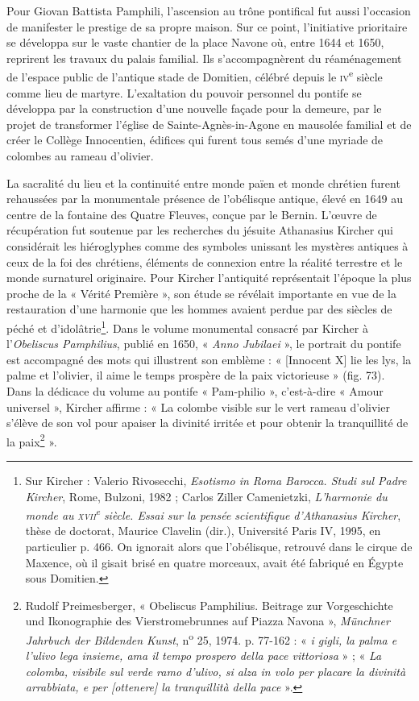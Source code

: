 \documentclass[12pt,twoside,openany]{book}
\begin{document}
Pour Giovan Battista Pamphili, l’ascension au trône pontifical fut aussi l’occasion de manifester le prestige de sa propre maison. Sur ce point, l’initiative prioritaire se développa sur le vaste chantier de la place Navone où, entre 1644 et 1650, reprirent les travaux du palais familial. Ils s’accompagnèrent du réaménagement de l’espace public de l’antique stade de Domitien, célébré depuis le \textsc{iv}\textsuperscript{e} siècle comme lieu de martyre. L’exaltation du pouvoir personnel du pontife se développa par la construction d’une nouvelle façade pour la demeure, par le projet de transformer l’église de Sainte-Agnès-in-Agone en mausolée familial et de créer le Collège Innocentien, édifices qui furent tous semés d’une myriade de colombes au rameau d’olivier.

La sacralité du lieu et la continuité entre monde païen et monde chrétien furent rehaussées par la monumentale présence de l’obélisque antique, élevé en 1649 au centre de la fontaine des Quatre Fleuves, conçue par le Bernin. L’œuvre de récupération fut soutenue par les recherches du jésuite Athanasius Kircher qui considérait les hiéroglyphes comme des symboles unissant les mystères antiques à ceux de la foi des chrétiens, éléments de connexion entre la réalité terrestre et le monde surnaturel originaire. Pour Kircher l’antiquité représentait l’époque la plus proche de la « Vérité Première », son étude se révélait importante en vue de la restauration d’une harmonie que les hommes avaient perdue par des siècles de péché et d’idolâtrie\footnote{Sur Kircher : Valerio Rivosecchi, \textit{Esotismo in Roma Barocca. Studi sul Padre Kircher}, Rome, Bulzoni, 1982 ; Carlos Ziller Camenietzki, \textit{L’harmonie du monde au }\textit{\textsc{xvii}}\textit{\textsuperscript{e}}\textit{ siècle. Essai sur la pensée scientifique d’Athanasius Kircher}, thèse de doctorat, Maurice Clavelin (dir.), Université Paris IV, 1995, en particulier p. 466. On ignorait alors que l’obélisque, retrouvé dans le cirque de Maxence, où il gisait brisé en quatre morceaux, avait été fabriqué en Égypte sous Domitien.}. Dans le volume monumental consacré par Kircher à l’\textit{Obeliscus Pamphilius}, publié en 1650, « \textit{Anno Jubilaei} », le portrait du pontife est accompagné des mots qui illustrent son emblème : « [Innocent X] lie les lys, la palme et l’olivier, il aime le temps prospère de la paix victorieuse » (fig. 73). Dans la dédicace du volume au pontife « Pam-philio », c’est-à-dire « Amour universel », Kircher affirme : « La colombe visible sur le vert rameau d’olivier s’élève de son vol pour apaiser la divinité irritée et pour obtenir la tranquillité de la paix\footnote{Rudolf Preimesberger, « Obeliscus Pamphilius. Beitrage zur Vorgeschichte und Ikonographie des Vierstromebrunnes auf Piazza Navona », \textit{Münchner Jahrbuch der Bildenden Kunst}, n\textsuperscript{o} 25, 1974. p. 77-162 : « \textit{i gigli, la palma e l’ulivo lega insieme, ama il tempo prospero della pace vittoriosa} » ; « \textit{La colomba, visibile sul verde ramo d'ulivo, si alza in volo per placare la divinità arrabbiata, e per [ottenere] la tranquillità della pace} ».} ».
\end{document}
